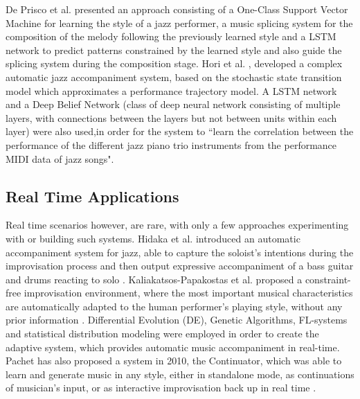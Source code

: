     De Prisco et al. presented an approach consisting of a One-Class Support Vector Machine for learning the style of a jazz performer, a music splicing system for the composition of the melody following the previously learned style and a LSTM network to predict patterns constrained by the learned style and also guide the splicing system during the composition stage. Hori et al. \cite{hori2017jazz}, developed a complex automatic jazz accompaniment system, based on the stochastic state transition model which approximates a performance trajectory model. A LSTM network and a Deep Belief Network (class of deep neural network consisting of multiple layers, with connections between the layers but not between units within each layer) were also used,in order for the system to ``learn the correlation between the performance of the different jazz piano trio instruments from the performance MIDI data of jazz songs".
    
    
    \subsection{Real Time Applications}
    Real time scenarios however, are rare, with only a few approaches experimenting with or building such systems. Hidaka et al. introduced an automatic accompaniment system for jazz, able to capture the soloist’s intentions during the improvisation process and then output expressive accompaniment of a bass guitar and drums reacting to solo \cite{hidaka1995automatic}. Kaliakatsos-Papakostas et al. proposed a constraint-free improvisation environment, where the most important musical characteristics are automatically adapted to the human performer's playing style, without any prior information  \cite{kaliakatsos2012intelligent}. Differential Evolution (DE), Genetic Algorithms, FL-systems and statistical distribution modeling were employed in order to create the adaptive system, which provides automatic music accompaniment in real-time. Pachet has also proposed a system in 2010, the Continuator, which was able to learn and generate music in any style, either in standalone mode, as continuations of musician’s input, or as interactive improvisation back up in real time \cite{pachet2003continuator}. 



    
    